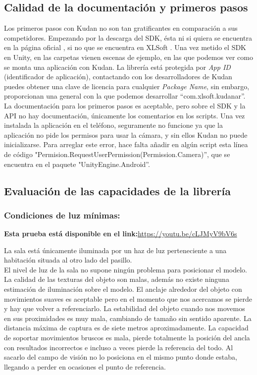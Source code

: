 \subsection{Calidad de la documentación y primeros pasos}
Los primeros pasos con Kudan no son tan gratificantes en comparación a sus competidores. Empezando por la descarga del SDK, ésta ni si quiera se encuentra en la página oficial \cite{Kudan_Official}, si no que se encuentra en XLSoft \cite{Kudan}. Una vez metido el SDK en Unity, en las carpetas vienen escenas de ejemplo, en las que podemos ver como se monta una aplicación con Kudan. La librería está protegida por \textit{App ID} (identificador de aplicación), contactando con los desarrolladores de Kudan puedes obtener una clave de licencia para cualquier \textit{Package Name}, sin embargo, proporcionan una general con la que podemos desarrollar ``com.xlsoft.kudanar''. \cite{Kudan_License}La documentación para los primeros pasos es aceptable, pero sobre el SDK y la API no hay documentación, únicamente los comentarios en los scripts. Una vez instalada la aplicación en el teléfono, seguramente no funcione ya que la aplicación no pide los permisos para usar la cámara, y sin ellos Kudan no puede inicializarse. Para arreglar este error, hace falta añadir en algún script esta línea de código "Permision.RequestUserPermission(Permission.Camera)'', que se encuentra en el paquete "UnityEngine.Android''.
\subsection{Evaluación de las capacidades de la librería}
\subsubsection{Condiciones de luz mínimas:}

\textbf{Esta prueba está disponible en el link:}\url{https://youtu.be/cLJMyV9bV6s}

La sala está únicamente iluminada por un haz de luz perteneciente a una habitación situada al otro lado del pasillo.\\

El nivel de luz de la sala no supone ningún problema para posicionar el modelo. La calidad de las texturas del objeto son malas, además no existe ninguna estimación de iluminación sobre el modelo. El anclaje alrededor del objeto con movimientos suaves es aceptable pero en el momento que nos acercamos se pierde y hay que volver a referenciarlo. La estabilidad del objeto cuando nos movemos en sus proximidades es muy mala, cambiando de tamaño sin sentido aparente. La distancia máxima de captura es de siete metros aproximadamente. La capacidad de soportar movimientos bruscos es mala, pierde totalmente la posición del ancla con resultados incorrectos e incluso a veces pierde la referencia del todo. Al sacarlo del campo de visión no lo posiciona en el mismo punto donde estaba, llegando a perder en ocasiones el punto de referencia.

